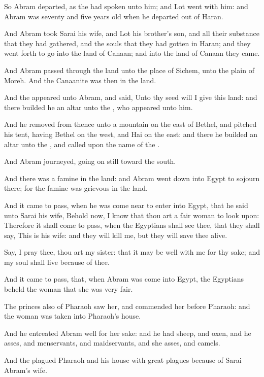 \Verse So Abram departed, as the \LORD had spoken unto him; and Lot went with him: and Abram was seventy and five years old when he departed out of Haran.

\Verse And Abram took Sarai his wife, and Lot his brother's son, and all their substance that they had gathered, and the souls that they had gotten in Haran; and they went forth to go into the land of Canaan; and into the land of Canaan they came.

\Verse And Abram passed through the land unto the place of Sichem, unto the plain of Moreh. And the Canaanite was then in the land.

\Verse And the \LORD appeared unto Abram, and said, Unto thy seed will I give this land: and there builded he an altar unto the \LORD, who appeared unto him.

\Verse And he removed from thence unto a mountain on the east of Bethel, and pitched his tent, having Bethel on the west, and Hai on the east: and there he builded an altar unto the \LORD, and called upon the name of the \LORD.

\Verse And Abram journeyed, going on still toward the south.

\Verse And there was a famine in the land: and Abram went down into Egypt to sojourn there; for the famine was grievous in the land.

\Verse And it came to pass, when he was come near to enter into Egypt, that he said unto Sarai his wife, Behold now, I know that thou art a fair woman to look upon: \Verse Therefore it shall come to pass, when the Egyptians shall see thee, that they shall say, This is his wife: and they will kill me, but they will save thee alive.

\Verse Say, I pray thee, thou art my sister: that it may be well with me for thy sake; and my soul shall live because of thee.

\Verse And it came to pass, that, when Abram was come into Egypt, the Egyptians beheld the woman that she was very fair.

\Verse The princes also of Pharaoh saw her, and commended her before Pharaoh: and the woman was taken into Pharaoh's house.

\Verse And he entreated Abram well for her sake: and he had sheep, and oxen, and he asses, and menservants, and maidservants, and she asses, and camels.

\Verse And the \LORD plagued Pharaoh and his house with great plagues because of Sarai Abram's wife.

